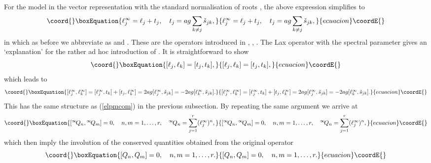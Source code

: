 \documentclass[a4paper,12pt]{article}
\begin{document}
For the \coordHE{} model in the vector representation
\coordHE{}
with the standard normalisation of roots \coordHE{}, the above expression
simplifies to
\begin{equation}\coord{}\boxEquation{
   \ell^\infty_j=\ell_j +t_j,\quad
   t_j=ag\sum_{k\neq j}
   \check{s}_{jk},
}{
   \ell^\infty_j=\ell_j +t_j,\quad
   t_j=ag\sum_{k\neq j}
   \check{s}_{jk},
}{ecuacion}\coordE{}\end{equation}
in which as before we abbreviate \coordHE{} as \coordHE{}
and \coordHE{}.
These are the operators introduced in \cite{Pol},
\coordHE{},
\coordHE{}.
The Lax operator with the spectral parameter gives an `explanation' for the
rather ad hoc introduction of \coordHE{}. It is straightforward to show
\begin{equation}\coord{}\boxEquation{
   [\ell_j,\ell_k]=[t_j,t_k],
}{
   [\ell_j,\ell_k]=[t_j,t_k],
}{ecuacion}\coordE{}\end{equation}
which leads to
\begin{equation}\coord{}\boxEquation{
   [\ell^\infty_j,\ell^\infty_k]=[\ell^\infty_j,t_k]+[t_j,\ell^\infty_k]
   =2ag[\ell^\infty_j,\check{s}_{jk}]
   =-2ag[\ell^\infty_k,\check{s}_{jk}].
}{
   [\ell^\infty_j,\ell^\infty_k]=[\ell^\infty_j,t_k]+[t_j,\ell^\infty_k]
   =2ag[\ell^\infty_j,\check{s}_{jk}]
   =-2ag[\ell^\infty_k,\check{s}_{jk}].
}{ecuacion}\coordE{}\end{equation}
This has the same structure as (\ref{elpmcom}) in the previous subsection.
By repeating the same argument we arrive at \cite{Pol}
\begin{equation}\coord{}\boxEquation{
   [{}^\infty\! Q_n,{}^\infty\! Q_m]=0,\quad n,m=1,\ldots,r,\quad
   {}^\infty\! Q_n=\sum_{j=1}^r(\ell^\infty_j)^n,
}{
   [{}^\infty\! Q_n,{}^\infty\! Q_m]=0,\quad n,m=1,\ldots,r,\quad
   {}^\infty\! Q_n=\sum_{j=1}^r(\ell^\infty_j)^n,
}{ecuacion}\coordE{}\end{equation}
which then imply the involution of the conserved quantities obtained from
the original \coordHE{} operator
\begin{equation}\coord{}\boxEquation{
   [Q_n,Q_m]=0,\quad n,m=1,\ldots,r.
}{
   [Q_n,Q_m]=0,\quad n,m=1,\ldots,r.
}{ecuacion}\coordE{}\end{equation}
\end{document}
